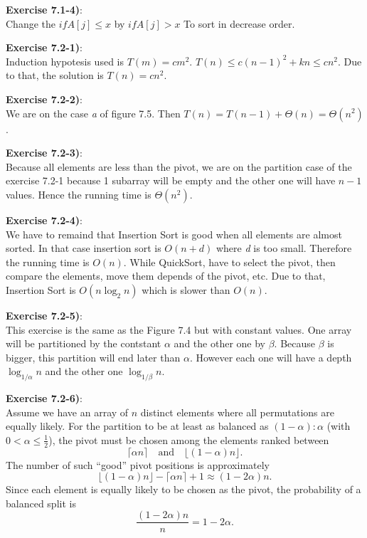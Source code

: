 \documentclass{article}
\newcounter{exercise}[section]   %
\begin{document}
\textbf{Exercise 7.1-4)}:\\
Change the \(if A[j] \leq x\) by \(if A[j] > x\) To sort in decrease order.

\textbf{Exercise 7.2-1)}:\\
Induction hypotesis used is \(T(m) = cm^2\). \(T(n) \leq c(n - 1)^2 + kn \leq cn^2\). Due 
to that, the solution is \(T(n) = cn^2\).

\textbf{Exercise 7.2-2)}:\\
We are on the case \textit{a} of figure 7.5. Then \(T(n) = T(n - 1) + \Theta(n) = \Theta(n^2)\).

\textbf{Exercise 7.2-3)}:\\
Because all elements are less than the pivot, we are on the partition case of the exercise
7.2-1 because 1 subarray will be empty and the other one will have \(n - 1\) values. Hence
the running time is \(\Theta(n^2)\).

\textbf{Exercise 7.2-4)}:\\
We have to remaind that Insertion Sort is good when all elements are almost sorted. In that
case insertion sort is \(O(n + d)\) where \textit{d} is too small. Therefore the running
time is \(O(n)\). While QuickSort, have to select the pivot, then compare the elements,
move them depends of the pivot, etc. Due to that, Insertion Sort is \(O(n \log_2 n)\) which
is slower than \(O(n)\).

\textbf{Exercise 7.2-5)}:\\
This exercise is the same as the Figure 7.4 but with constant values. One array will be
partitioned by the contstant \(\alpha\) and the other one by \(\beta\). Because \(\beta\)
is bigger, this partition will end later than \(\alpha\). However each one will have a depth
\(\log_{1 / \alpha} n\) and the other one \(\log_{1 / \beta} n\). 

\textbf{Exercise 7.2-6)}:\\
Assume we have an array of \( n \) distinct elements where all permutations are equally 
likely.
For the partition to be at least as balanced as \( (1-\alpha):\alpha \) (with \(0 < \alpha \le \frac{1}{2}\)), the pivot must be chosen among the elements ranked between
\[
\lceil \alpha n \rceil \quad \text{and} \quad \lfloor (1-\alpha) n \rfloor.
\]
The number of such “good” pivot positions is approximately
\[
\lfloor (1-\alpha)n \rfloor - \lceil \alpha n \rceil + 1 \approx (1-2\alpha)n.
\]
Since each element is equally likely to be chosen as the pivot, the probability of a 
balanced split is
\[
\frac{(1-2\alpha)n}{n} = 1-2\alpha.
\]
\end{document}

